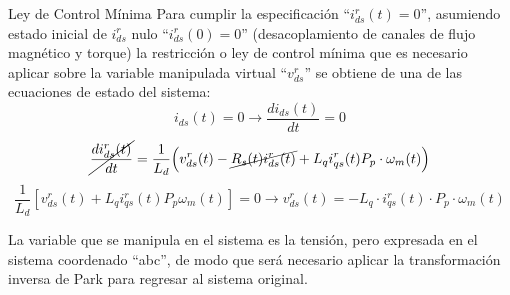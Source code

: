 \documentclass[12pt]{beamer}
\begin{document}
\begin{frame}{Ley de Control Mínima}\footnotesize
Para cumplir la especificación ``$i^r_{ds}(t) = 0$'', asumiendo estado inicial de \(i^r_{ds}\) nulo ``$i^r_{ds}(0) = 0$'' (desacoplamiento de canales de flujo magnético y torque) la restricción o ley de control mínima que es necesario aplicar sobre la variable manipulada virtual ``$v^r_{ds}$'' se obtiene de una de las ecuaciones de estado del sistema:
\begin{equation}
i_{ds}(t) =  0 \rightarrow \frac{di_{ds}(t)}{dt} = 0
\end{equation}
\begin{equation}
\cancel{\frac{d i_{ds}^r(t)}{dt}} = \frac{1}{L_d} \Big( v_{ds}^r(t) - \cancel{R_s(t) i_{ds}^r(t)} + L_q i_{qs}^r(t) P_p \cdot \omega_m(t) \Big)
\label{eq:ExpresionIds}
\end{equation}
\begin{equation}
\frac{1}{L_d}\left[v^r_{ds}(t) + L_qi^r_{qs}(t)P_p\omega_m(t)\right] = 0 \rightarrow v^r_{ds}(t) = -L_q\cdot i^r_{qs}(t)\cdot P_p\cdot\omega_m(t)
\end{equation}

La variable que se manipula en el sistema es la tensión, pero expresada en el sistema coordenado ``abc'', de modo que será necesario aplicar la transformación inversa de Park para regresar al sistema original.
\end{frame}
\end{document}
